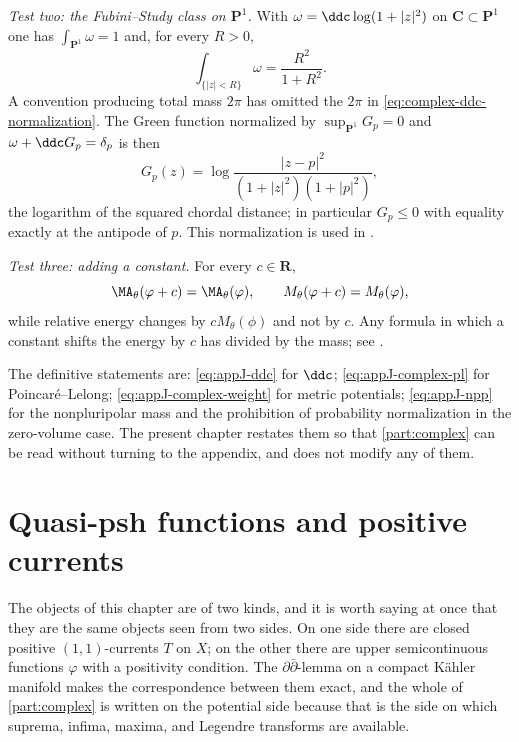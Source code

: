 \emph{Test two: the Fubini--Study class on $\mathbf P^1$.}  With
$\omega=\ddc\log(1+|z|^2)$ on $\mathbf C\subset\mathbf P^1$ one has
$\int_{\mathbf P^1}\omega=1$ and, for every $R>0$,
\[
 \int_{\{|z|<R\}}\omega=\frac{R^2}{1+R^2}.
\]
A convention producing total mass $2\pi$ has omitted the $2\pi$ in
\eqref{eq:complex-ddc-normalization}.  The Green function normalized by
$\sup_{\mathbf P^1}G_p=0$ and $\omega+\ddc G_p=\delta_p$ is then
\[
 G_p(z)=\log\frac{|z-p|^2}{(1+|z|^2)(1+|p|^2)},
\]
the logarithm of the squared chordal distance; in particular $G_p\leq0$
with equality exactly at the antipode of $p$.  This normalization is used
in .

\emph{Test three: adding a constant.}  For every $c\in\mathbf R$,
\[
 \MA_\theta(\varphi+c)=\MA_\theta(\varphi),
 \qquad
 M_\theta(\varphi+c)=M_\theta(\varphi),
\]
while relative energy changes by $cM_\theta(\phi)$ and not by $c$.  Any
formula in which a constant shifts the energy by $c$ has divided by the
mass; see .

\begin{remark}
\label{rem:ch51-convention-map}
The definitive statements are:
\eqref{eq:appJ-ddc} for $\ddc$;
\eqref{eq:appJ-complex-pl} for Poincar\'e--Lelong;
\eqref{eq:appJ-complex-weight} for metric potentials;
\eqref{eq:appJ-npp} for the nonpluripolar mass and the prohibition of
probability normalization in the zero-volume case.  The present chapter
restates them so that \cref{part:complex} can be read without turning to
the appendix, and does not modify any of them.
\end{remark}

\section{Quasi-psh functions and positive currents}
\label{sec:ch51-qpsh}

The objects of this chapter are of two kinds, and it is worth saying at
once that they are the same objects seen from two sides.  On one side
there are closed positive $(1,1)$-currents $T$ on $X$; on the other
there are upper semicontinuous functions $\varphi$ with a positivity
condition.  The $\partial\bar\partial$-lemma on a compact K\"ahler
manifold makes the correspondence between them exact, and the whole of
\cref{part:complex} is written on the potential side because that is the
side on which suprema, infima, maxima, and Legendre transforms are
available.

